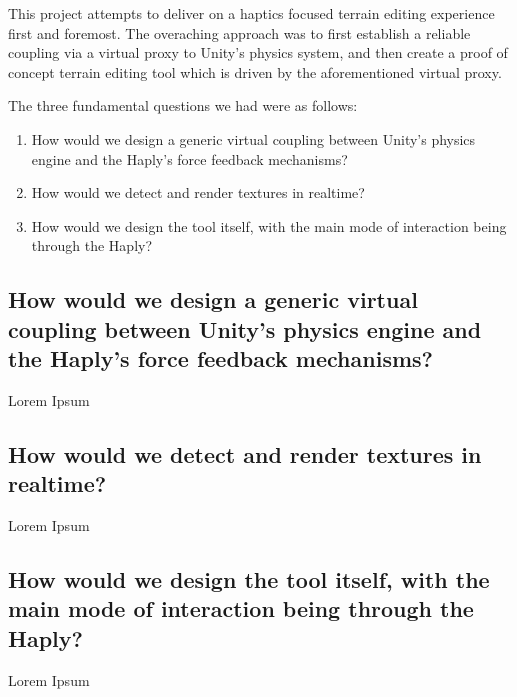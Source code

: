 This project attempts to deliver on a haptics focused terrain editing experience first and foremost. The overaching approach was to first establish a reliable coupling via a virtual proxy to Unity's physics system, and then create a proof of concept terrain editing tool which is driven by the aforementioned virtual proxy.

The three fundamental questions we had were as follows:

\begin{enumerate}
    \item How would we design a generic virtual coupling between Unity's physics engine and the Haply's force feedback mechanisms?
    \item How would we detect and render textures in realtime?
    \item How would we design the tool itself, with the main mode of interaction being through the Haply?
\end{enumerate}

\subsection{How would we design a generic virtual coupling between Unity's physics engine and the Haply's force feedback mechanisms?}

Lorem Ipsum

\subsection{How would we detect and render textures in realtime?}

Lorem Ipsum

\subsection{How would we design the tool itself, with the main mode of interaction being through the Haply?}

Lorem Ipsum
